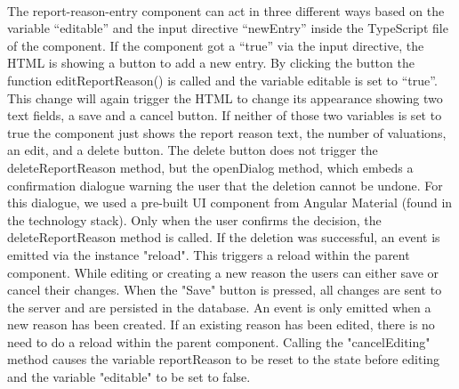 \vspace{5mm}
\\
The report-reason-entry component can act in three different ways based on the variable “editable” and the input directive “newEntry” inside the TypeScript file of the component. If the component got a “true” via the input directive, the HTML is showing a button to add a new entry. By clicking the button the function editReportReason() is called and the variable editable is set to “true”. This change will again trigger the HTML to change its appearance showing two text fields, a save and a cancel button. If neither of those two variables is set to true the component just shows the report reason text, the number of valuations, an edit, and a delete button. The delete button does not trigger the deleteReportReason method, but the openDialog method, which embeds a confirmation dialogue warning the user that the deletion cannot be undone. For this dialogue, we used a pre-built UI component from Angular Material (found in the technology stack). Only when the user confirms the decision, the deleteReportReason method is called. If the deletion was successful, an event is emitted via the instance "reload".
This triggers a reload within the parent component. While editing or creating a new reason the users can either save or cancel their changes. When the "Save" button is pressed, all changes are sent to the server and are persisted in the database. An event is only emitted when a new reason has been created. If an existing reason has been edited, there is no need to do a reload within the parent component. Calling the "cancelEditing" method causes the variable reportReason to be reset to the state before editing and the variable
"editable" to be set to false.

